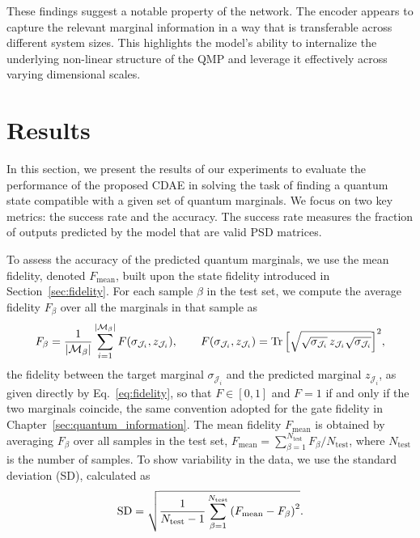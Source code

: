 These findings suggest a notable property of the network. The encoder appears to capture the relevant marginal information in a way that is transferable across different system sizes. This highlights the model's ability to internalize the underlying non-linear structure of the QMP and leverage it effectively across varying dimensional scales.

\section{Results}
\label{sec:qmp-results}

In this section, we present the results of our experiments to evaluate the performance of the proposed CDAE in solving the task of finding a quantum state compatible with a given set of quantum marginals. We focus on two key metrics: the success rate and the accuracy. The success rate measures the fraction of outputs predicted by the model that are valid PSD matrices.

To assess the accuracy of the predicted quantum marginals, we use the mean fidelity, denoted $F_{\mathrm{mean}}$, built upon the state fidelity introduced in Section~\ref{sec:fidelity}. For each sample $\beta$ in the test set, we compute the average fidelity $F_\beta$ over all the marginals in that sample as
\begin{equation}
F_\beta = \frac{1}{\abs{\mathcal{M}_\beta}} \sum_{i=1}^{\abs{\mathcal{M}_\beta}} F\qty(\sigma_{\mathcal{J}_i}, z_{\mathcal{J}_i}),
\qquad
F\qty(\sigma_{\mathcal{J}_i}, z_{\mathcal{J}_i}) = \Tr\qty[ \sqrt{ \sqrt{\sigma_{\mathcal{J}_i}}\, z_{\mathcal{J}_i} \sqrt{\sigma_{\mathcal{J}_i}} } ]^2,
\end{equation}
the fidelity between the target marginal $\sigma_{\mathcal{J}_i}$ and the predicted marginal $z_{\mathcal{J}_i}$, as given directly by Eq.~\eqref{eq:fidelity}, so that $F \in [0,1]$ and $F = 1$ if and only if the two marginals coincide, the same convention adopted for the gate fidelity in Chapter~\ref{sec:quantum_information}. The mean fidelity $F_{\mathrm{mean}}$ is obtained by averaging $F_\beta$ over all samples in the test set, $F_{\mathrm{mean}} = \sum_{\beta=1}^{N_{\mathrm{test}}} F_\beta / N_{\mathrm{test}}$, where $N_{\mathrm{test}}$ is the number of samples. To show variability in the data, we use the standard deviation (SD), calculated as
\begin{equation}
\mathrm{SD} = \sqrt{ \frac{1}{N_{\mathrm{test}}-1} \sum_{\beta=1}^{N_{\mathrm{test}}} \qty(F_{\mathrm{mean}} - F_\beta)^2 }.
\end{equation}

